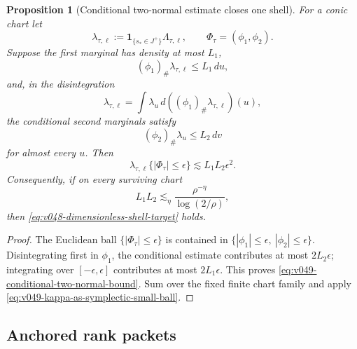 \documentclass[10pt]{article}
\newtheorem{proposition}[theorem]{Proposition}
\begin{document}
\begin{proposition}[Conditional two-normal estimate closes one shell]
\label{prop:v049-conditional-two-normal-closure}
For a conic chart let
\[
\lambda_{\tau,\ell}
:=
\mathbf 1_{\{s_*\in J^+\}}\Lambda_{\tau,\ell},
\qquad
\Phi_\tau=(\phi_1,\phi_2).
\]
Suppose the first marginal has density at most \(L_1\),
\[
(\phi_1)_\#\lambda_{\tau,\ell}\le L_1\,du,
\]
and, in the disintegration
\[
\lambda_{\tau,\ell}
=
\int \lambda_u\,d((\phi_1)_\#\lambda_{\tau,\ell})(u),
\]
the conditional second marginals satisfy
\[
(\phi_2)_\#\lambda_u\le L_2\,dv
\]
for almost every \(u\).  Then
\begin{equation}
\label{eq:v049-conditional-two-normal-bound}
\boxed{
\lambda_{\tau,\ell}\{|\Phi_\tau|\le\epsilon\}
\lesssim
L_1L_2\epsilon^2.
}
\end{equation}
Consequently, if on every surviving chart
\begin{equation}
\label{eq:v049-two-normal-density-target}
L_1L_2
\lesssim_\eta
\frac{\rho^{-\eta}}{\log(2/\rho)},
\end{equation}
then \eqref{eq:v048-dimensionless-shell-target} holds.
\end{proposition}

\begin{proof}
The Euclidean ball \(\{|\Phi_\tau|\le\epsilon\}\) is contained in
\(\{|\phi_1|\le\epsilon,\ |\phi_2|\le\epsilon\}\).  Disintegrating first in \(\phi_1\), the
conditional estimate contributes at most \(2L_2\epsilon\); integrating over
\([-\epsilon,\epsilon]\) contributes at most \(2L_1\epsilon\).  This proves
\eqref{eq:v049-conditional-two-normal-bound}.  Sum over the fixed finite chart family and apply
\eqref{eq:v049-kappa-as-symplectic-small-ball}.
\end{proof}

\subsection{Anchored rank packets}
\end{document}
